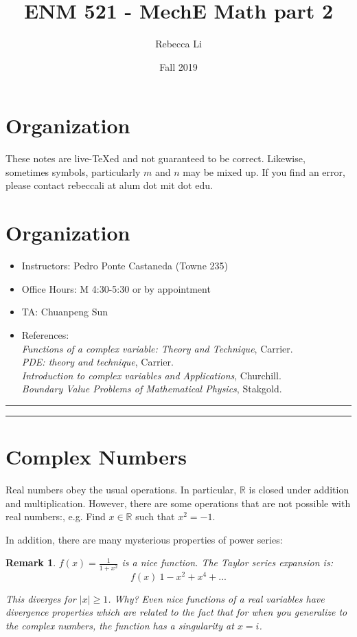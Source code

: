 \documentclass{article}
\title{ENM 521 - MechE Math part 2}
\author{Rebecca Li}
\date{Fall 2019}
\newtheorem*{remark}{Remark}
\theoremstyle{definition}
\newcommand{\Section}[1]{\hrule\hrule\section{#1}}
\def\R{\mathbb{R}}
\begin{document}
	\maketitle
	\tableofcontents

\section*{Organization}
These notes are live-TeXed and not guaranteed to be correct. Likewise, sometimes symbols, particularly $m$ and $n$ may be mixed up. If you find an error, please contact rebeccali at alum dot mit dot edu. 
	
\section*{Organization}
\begin{itemize}
	\item Instructors: Pedro Ponte Castaneda  (Towne 235)
	\item Office Hours: M 4:30-5:30 or by appointment 
	\item TA: Chuanpeng Sun
	\item References: 
	\\\textit{Functions of a complex variable: Theory and Technique}, Carrier. 
	\\\textit{PDE: theory and technique}, Carrier. 
	\\\textit{Introduction to complex variables and Applications}, Churchill. 
	\\\textit{Boundary Value Problems of Mathematical Physics}, Stakgold.
	

\end{itemize}
\Section{Complex Numbers}
Real numbers obey the usual operations. In particular, $\R$ is closed under addition and multiplication. However, there are some operations that are not possible with real numbers:, e.g. Find $x \in \R$ such that $x^2 = -1$.


In addition, there are many mysterious properties of power series:

\begin{remark}
$f(x) = \frac{1}{1+x^2}$ is a nice function. The Taylor series expansion is:
	$$f(x) ~ 1-x^2+x^4+...$$
	
	This diverges for $|x| \geq 1$. Why?
	Even nice functions of a real variables have divergence properties which are related to the fact that for when you generalize to the complex numbers, the function has a singularity at $x=i$.
\end{remark}
\end{document}
